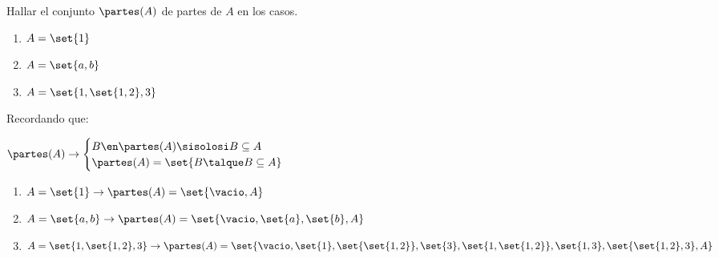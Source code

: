 \begin{enunciado}{\ejercicio}
  Hallar el conjunto $\partes(A)$ de partes de $A$ en los casos.
  \begin{multicols}{3}
    \begin{enumerate}[label=\roman*)]
      \item $A = \set{1}$
      \item $A = \set{a,b}$
      \item $A = \set{1,\set{1,2},3}$
    \end{enumerate}
  \end{multicols}
\end{enunciado}

  Recordando que:\par
$
  \partes(A) \to
  \begin{cases}
    B \en \partes(A) \sisolosi B \subseteq A \\
    \partes(A) = \set{B \talque B \subseteq A}
  \end{cases}
$
\begin{enumerate}[label=(\roman*)]
  \item $A = \set{1} \to \partes(A) = \set{\vacio, A}$ \Tilde
  \item $A =
          \set{a, b}
          \to
          \partes(A) =
          \set{
            \vacio,
            \set{a},
            \set{b},
            A
          }$\Tilde
  \item $
          A =
          \set{1, \set{1,2}, 3}
          \to
          \partes(A) =
          \set{
            \vacio,
            \set{1},
            \set{\set{1,2}},
            \set{3},
            \set{1,\set{1,2}},
            \set{1,3},
            \set{\set{1,2},3},
            A
          }$\Tilde
\end{enumerate}
